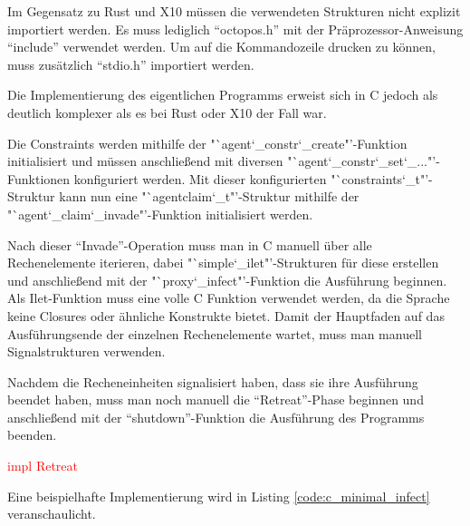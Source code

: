 Im Gegensatz zu Rust und X10 müssen die verwendeten Strukturen nicht explizit importiert werden. Es muss lediglich
"`octopos.h"' mit der Präprozessor-Anweisung "`include"' verwendet werden.
Um auf die Kommandozeile drucken zu können, muss zusätzlich "`stdio.h"' importiert werden.

Die Implementierung des eigentlichen Programms erweist sich in C jedoch als deutlich komplexer als es bei
Rust oder X10 der Fall war.

Die Constraints werden mithilfe der "`agent\char`_constr\char`_create"'-Funktion initialisiert
und müssen anschließend mit diversen "`agent\char`_constr\char`_set\char`_..."'-Funktionen konfiguriert werden.
Mit dieser konfigurierten "`constraints\char`_t"'-Struktur kann nun eine "`agentclaim\char`_t"'-Struktur mithilfe
der "`agent\char`_claim\char`_invade"'-Funktion initialisiert werden.

Nach dieser "`Invade"'-Operation muss man in C manuell über alle Rechenelemente iterieren, dabei
"`simple\char`_ilet"'-Strukturen für diese erstellen und anschließend mit der "`proxy\char`_infect"'-Funktion
die Ausführung beginnen. Als Ilet-Funktion muss eine volle C Funktion verwendet werden,
da die Sprache keine Closures oder ähnliche Konstrukte bietet.
Damit der Hauptfaden auf das Ausführungsende der einzelnen Rechenelemente wartet, muss
man manuell Signalstrukturen verwenden.

Nachdem die Recheneinheiten signalisiert haben, dass sie ihre Ausführung beendet haben, muss man noch manuell
die "`Retreat"'-Phase beginnen und anschließend mit der "`shutdown"'-Funktion die Ausführung des Programms beenden.

\textcolor{red}{impl Retreat}

Eine beispielhafte Implementierung wird in Listing \ref{code:c_minimal_infect} veranschaulicht.

